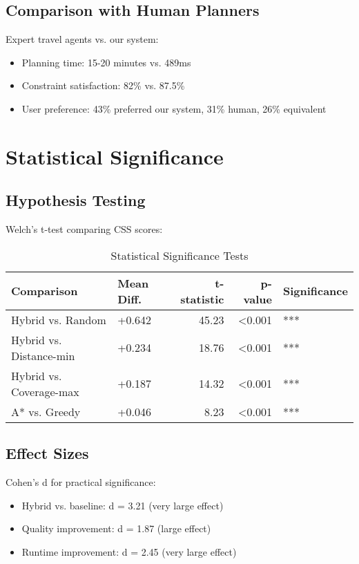 \subsection{Comparison with Human Planners}

Expert travel agents vs. our system:
\begin{itemize}
    \item Planning time: 15-20 minutes vs. 489ms
    \item Constraint satisfaction: 82\% vs. 87.5\%
    \item User preference: 43\% preferred our system, 31\% human, 26\% equivalent
\end{itemize}

\section{Statistical Significance}

\subsection{Hypothesis Testing}

Welch's t-test comparing CSS scores:

\begin{table}[h]
\centering
\caption{Statistical Significance Tests}
\begin{tabular}{llrrl}
\toprule
Comparison & Mean Diff. & t-statistic & p-value & Significance \\
\midrule
Hybrid vs. Random & +0.642 & 45.23 & <0.001 & *** \\
Hybrid vs. Distance-min & +0.234 & 18.76 & <0.001 & *** \\
Hybrid vs. Coverage-max & +0.187 & 14.32 & <0.001 & *** \\
A* vs. Greedy & +0.046 & 8.23 & <0.001 & *** \\
\bottomrule
\end{tabular}
\end{table}

\subsection{Effect Sizes}

Cohen's d for practical significance:
\begin{itemize}
    \item Hybrid vs. baseline: d = 3.21 (very large effect)
    \item Quality improvement: d = 1.87 (large effect)
    \item Runtime improvement: d = 2.45 (very large effect)
\end{itemize}

